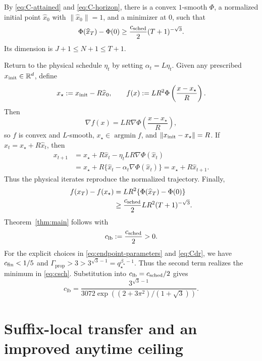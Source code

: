 \documentclass[11pt]{article}
\theoremstyle{definition}
\theoremstyle{remark}
\newcommand{\R}{\mathbb{R}}
\newcommand{\criticalexp}{\beta_{\star}}
\newcommand{\rankcut}{q_{\star}}
\newcommand{\argmin}{\operatorname*{argmin}}
\newcommand{\lbconst}{c_{\mathrm{lb}}}
\newcommand{\propconst}{\Gamma_{\mathrm{prop}}}
\begin{document}
By \eqref{eq:C-attained} and \eqref{eq:C-horizon}, there is a convex
\(1\)-smooth \(\Phi\), a normalized initial point \(\widehat x_0\) with
\(\|\widehat x_0\|=1\), and a minimizer at \(0\), such that
\begin{equation}
 \Phi(\widehat x_T)-\Phi(0)
 \ge\frac{c_{\rm sched}}2(T+1)^{-\sqrt3}.
 \label{eq:normalized-final}
\end{equation}
Its dimension is \(J+1\le N+1\le T+1\).

Return to the physical schedule \(\eta_t\) by setting
\(\alpha_t=L\eta_t\).
Given any prescribed \(x_{\rm init}\in\R^d\), define
\begin{equation}
 x_\star:=x_{\rm init}-R\widehat x_0,
 \qquad
 f(x):=LR^2\Phi\left(\frac{x-x_\star}{R}\right).
 \label{eq:physical-scaling}
\end{equation}
Then
\[
 \nabla f(x)=LR\nabla\Phi\left(\frac{x-x_\star}{R}\right),
\]
so \(f\) is convex and \(L\)-smooth, \(x_\star\in\argmin f\), and
\(\|x_{\rm init}-x_\star\|=R\).  If
\(x_t=x_\star+R\widehat x_t\), then
\[
\begin{aligned}
 x_{t+1}
 &=x_\star+R\widehat x_t-\eta_tLR\nabla\Phi(\widehat x_t)\\
 &=x_\star+R\{\widehat x_t-\alpha_t\nabla\Phi(\widehat x_t)\}
 =x_\star+R\widehat x_{t+1}.
\end{aligned}
\]
Thus the physical iterates reproduce the normalized trajectory.  Finally,
\[
\begin{aligned}
 f(x_T)-f(x_\star)
 &=LR^2\{\Phi(\widehat x_T)-\Phi(0)\}\\
 &\ge\frac{c_{\rm sched}}2LR^2(T+1)^{-\sqrt3}.
\end{aligned}
\]
Theorem~\ref{thm:main} follows with
\begin{equation}
 \lbconst:=\frac{c_{\rm sched}}2>0.
\end{equation}
For the explicit choices in \eqref{eq:endpoint-parameters} and
\eqref{eq:Cdr}, we have \(c_{\rm fin}<1/5\) and
\(\propconst>3>3^{\sqrt3-1}=\rankcut^{\criticalexp-1}\).  Thus the second
term realizes the minimum in \eqref{eq:csch}.  Substitution into
\(\lbconst=c_{\rm sched}/2\) gives
\begin{equation}
 \lbconst
 =\frac{3^{\sqrt3-1}}
        {3072\exp\!\left((2+3\pi^2)/(1+\sqrt3)\right)}.
 \label{eq:explicit-main-constant}
\end{equation}

\section{Suffix-local transfer and an improved anytime ceiling}
\label{sec:anytime-transfer}
\end{document}
